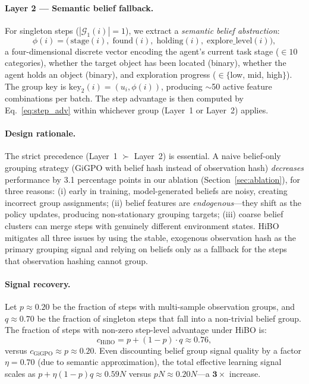 \documentclass{article}
\begin{document}
\paragraph{Layer 2 --- Semantic belief fallback.}
For singleton steps ($|\mathcal{G}_1(i)| = 1$), we extract a
\emph{semantic belief abstraction}:
\begin{equation}
  \phi(i) = \bigl(\,\text{stage}(i),\;\text{found}(i),\;\text{holding}(i),\;\text{explore\_level}(i)\bigr),
  \label{eq:belief_abstract}
\end{equation}
a four-dimensional discrete vector encoding the agent's current task stage
($\in 10$ categories), whether the target object has been located (binary),
whether the agent holds an object (binary), and exploration progress
($\in \{$low, mid, high$\}$).
The group key is $\text{key}_2(i) = (u_i, \phi(i))$, producing
$\sim$50 active feature combinations per batch.
The step advantage is then computed by Eq.~\eqref{eq:step_adv} within
whichever group (Layer~1 or Layer~2) applies.

\paragraph{Design rationale.}
The strict precedence (Layer~1 $\succ$ Layer~2) is essential.
A naive belief-only grouping strategy (GiGPO with belief hash instead of
observation hash) \emph{decreases} performance by 3.1 percentage points
in our ablation (Section~\ref{sec:ablation}), for three reasons:
(i) early in training, model-generated beliefs are noisy, creating
incorrect group assignments;
(ii) belief features are \emph{endogenous}---they shift as the policy
updates, producing non-stationary grouping targets;
(iii) coarse belief clusters can merge steps with genuinely different
environment states.
HiBO mitigates all three issues by using the stable, exogenous observation
hash as the primary grouping signal and relying on beliefs only as a fallback
for the steps that observation hashing cannot group.

\paragraph{Signal recovery.}
Let $p \approx 0.20$ be the fraction of steps with multi-sample observation
groups, and $q \approx 0.70$ be the fraction of singleton steps that fall
into a non-trivial belief group.
The fraction of steps with non-zero step-level advantage under HiBO is:
\begin{equation}
  c_{\text{HiBO}} = p + (1-p)\cdot q \approx 0.76,
  \label{eq:coverage}
\end{equation}
versus $c_{\text{GiGPO}} \approx p \approx 0.20$.
Even discounting belief group signal quality by a factor $\eta = 0.70$
(due to semantic approximation), the total effective learning signal scales
as $p + \eta(1-p)q \approx 0.59N$ versus $pN \approx 0.20N$---a $\mathbf{3\times}$
increase.
\end{document}
